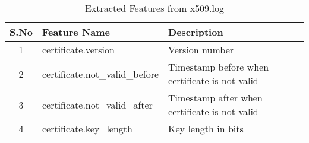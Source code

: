 \begin{table}[!htb]
	\caption{Extracted Features from x509.log\label{tab:2}}
	\begin{center}
		\begin{tabular}{c|p{}|p{}}\hline\hline
			S.No & Feature Name & \multicolumn{1}{l}{Description} \\ \hline
			1 & certificate.version & Version number \\
			2 & certificate.not\_valid\_before	& Timestamp before when certificate is not valid \\
			3 & certificate.not\_valid\_after	& Timestamp after when certificate is not valid \\
			4 & certificate.key\_length	& Key length in bits \\
			\hline\hline
		\end{tabular}
	\end{center}
\end{table}